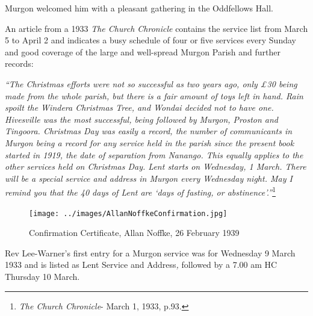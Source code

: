Murgon welcomed him with a pleasant gathering in the Oddfellows Hall.



An article from a 1933 \emph{The Church Chronicle} contains the service list from March 5 to April 2 and indicates a busy schedule of four or five services every Sunday and good coverage of the large and well-spread Murgon Parish and further records:



\emph{``The Christmas efforts were not so successful as two years ago, only \pounds30 being made from the whole parish, but there is a fair amount of toys left in hand. Rain spoilt the Windera Christmas Tree, and Wondai decided not to have one. Hivesville was the most successful, being followed by Murgon, Proston and Tingoora. Christmas Day was easily a record, the number of communicants in Murgon being a record for any service held in the parish since the present book started in 1919, the date of separation from Nanango. This equally applies to the other services held on Christmas Day. Lent starts on Wednesday, 1 March. There will be a special service and address in Murgon every Wednesday night. May I remind you that the 40 days of Lent are `days of fasting, or abstinence'.''}\footnote{\emph{The Church Chronicle}- March 1, 1933, p.93.}


\medskip








\begin{figure}[!htb]
\begin{center}
\texttt{[image: ../images/AllanNoffkeConfirmation.jpg]}
\caption{Confirmation Certificate, Allan Noffke, 26 February 1939}
\end{center}
\end{figure}




Rev Lee-Warner's first entry for a Murgon service was for Wednesday 9 March 1933 and is listed as Lent Service and Address\emph{,} followed by a 7.00 am HC Thursday 10 March.




